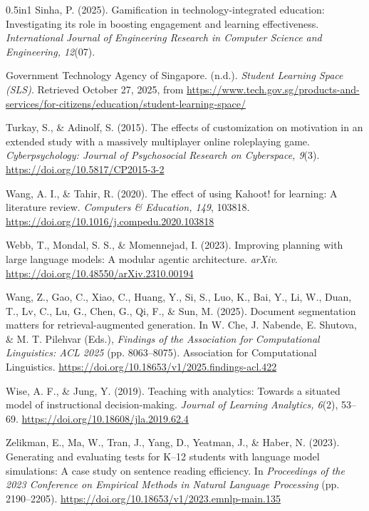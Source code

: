 \documentclass[
  12pt,
  a4paper,
]{report}
\begin{document}
\begin{hangparas}{0.5in}{1}
Sinha, P. (2025). Gamification in technology-integrated education: Investigating its role in boosting engagement and learning effectiveness. \textit{International Journal of Engineering Research in Computer Science and Engineering, 12}(07).

Government Technology Agency of Singapore. (n.d.). \textit{Student Learning Space (SLS)}. Retrieved October 27, 2025, from \url{https://www.tech.gov.sg/products-and-services/for-citizens/education/student-learning-space/}

Turkay, S., \& Adinolf, S. (2015). The effects of customization on motivation in an extended study with a massively multiplayer online roleplaying game. \textit{Cyberpsychology: Journal of Psychosocial Research on Cyberspace, 9}(3). \url{https://doi.org/10.5817/CP2015-3-2}

Wang, A. I., \& Tahir, R. (2020). The effect of using Kahoot! for learning: A literature review. \textit{Computers \& Education, 149}, 103818. \url{https://doi.org/10.1016/j.compedu.2020.103818}

Webb, T., Mondal, S. S., \& Momennejad, I. (2023). Improving planning with large language models: A modular agentic architecture. \textit{arXiv}. \url{https://doi.org/10.48550/arXiv.2310.00194}

Wang, Z., Gao, C., Xiao, C., Huang, Y., Si, S., Luo, K., Bai, Y., Li, W., Duan, T., Lv, C., Lu, G., Chen, G., Qi, F., \& Sun, M. (2025). Document segmentation matters for retrieval-augmented generation. In W. Che, J. Nabende, E. Shutova, \& M. T. Pilehvar (Eds.), \textit{Findings of the Association for Computational Linguistics: ACL 2025} (pp. 8063--8075). Association for Computational Linguistics. \url{https://doi.org/10.18653/v1/2025.findings-acl.422}

Wise, A. F., \& Jung, Y. (2019). Teaching with analytics: Towards a situated model of instructional decision-making. \textit{Journal of Learning Analytics, 6}(2), 53--69. \url{https://doi.org/10.18608/jla.2019.62.4}

Zelikman, E., Ma, W., Tran, J., Yang, D., Yeatman, J., \& Haber, N. (2023). Generating and evaluating tests for K--12 students with language model simulations: A case study on sentence reading efficiency. In \textit{Proceedings of the 2023 Conference on Empirical Methods in Natural Language Processing} (pp. 2190--2205). \url{https://doi.org/10.18653/v1/2023.emnlp-main.135}

\end{hangparas}
\endgroup


\end{document}

